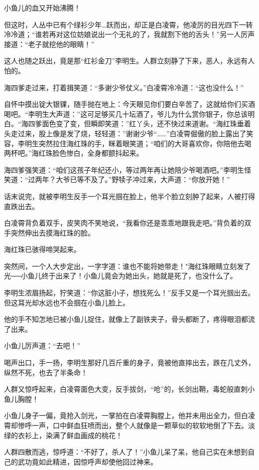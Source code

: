 \documentclass[12pt,oneside]{book}
\begin{document}
小鱼儿的血又开始沸腾！

但这时，人丛中已有个绿衫少年\ldots 跃而出，却正是白凌霄，他凌厉的目光四下一转冷冷道；``谁若再对这位妨娘说出一个无礼的了，我就割下他的舌头！''另一人厉声接道：``老子就挖他的眼睛！''

这人也随之跃出，竟是那``红衫金刀''李明生。人群立刻静了下来，恶人，永远有人怕的。

海四爹走过来，打着揖笑道：``多谢少爷仗义。''白凌霄冷冷道：``这也没什么！''

自怀中摸出锭大银锞，随手抛在地上：今天眼见你们要白辛苦了，这就给你们买酒喝吧。``李明生大声道：''这可足够买几十坛酒了，爷儿为什么赏你银子，你总该明白。``海四爹面色变了变，但瞬即笑道：''红丫头，还不快过来道谢。``海红珠垂着头走过来，股上像是发了烧，轻轻道：''谢谢少爷``\ldots\ldots{}''白凌霄倔傲的脸上露出了笑容，李明生突然拉住海红珠的手，眯着眼笑道；``咱们的大哥喜欢你，你陪他去喝两杯吧。''海红珠脸色惨白，全身都颤抖起来。

海四爹强笑道：``咱们这孩子年纪还小，等过两年再让她陪少爷喝酒吧。''李明生怪笑道：``过两年？大爷已等不及了。''野犊子冲过来，大声道：``你放开她！''

话末说完，就被李明生反手一个耳光掴在脸上，他半个脸立刻肿了起来，人被打得直跌出去。

白凌霄背负着双手，皮笑肉不笑地说，``我看你还是乖乖地跟我走吧。''背负着的双手突然伸出去摸海红珠的脸。

海红珠已骇得啼哭起来。

突然间，一个人大步定出，一字字道：谁也不能将她带走！"海红珠眼睛立刻发了光──小鱼儿终于出来了！小鱼儿竟会为她出头，她就是死了，也没什么了。

李明生浓眉扬起，狞笑道：``你这脏小子，想找死么！''反手又是一个耳光掴出去。但这耳光却水远也不会掴在小鱼儿脸上。

他的手不知怎地已被小鱼儿捉住，就像上了副铁夹子，骨头都断了，疼得眼泪都流了出来。

小鱼儿厉声道：``去吧！''

喝声出口，手一扬，李明生那好几百斤重的身子，竟被他直摔出去，跌在几丈外，纵然不死，也去了半条命！

人群又惊呼起来，白凌霄面色大变，反手拔剑，``呛''的，长剑出鞘，毒蛇般直刺小鱼儿胸膛！

小鱼儿身子一偏，竟抢入剑光，一掌拍在白凌霄胸膛上，他并未用出全力，但白凌霄却惨呼一声，口中鲜血狂喷而出，整个人就像是一颗草似的软软地倒了下去。淡绿的衣衫上，染满了鲜血画成的桃花！

人群四散而逃，惊呼道：``不好了，杀人了！''小鱼儿呆了呆，他自己实在未想到自己的武功竟如此精进，因惊呼声却使他回过神来。
\end{document}
